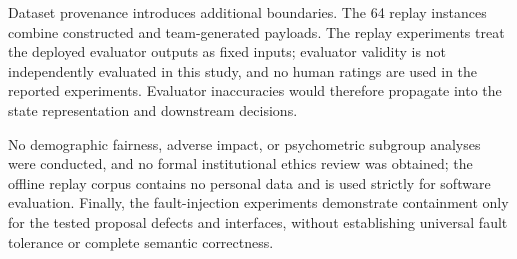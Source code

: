 Dataset provenance introduces additional boundaries. The 64 replay instances combine constructed and team-generated payloads. The replay experiments treat the deployed evaluator outputs as fixed inputs; evaluator validity is not independently evaluated in this study, and no human ratings are used in the reported experiments. Evaluator inaccuracies would therefore propagate into the state representation and downstream decisions.

No demographic fairness, adverse impact, or psychometric subgroup analyses were conducted, and no formal institutional ethics review was obtained; the offline replay corpus contains no personal data and is used strictly for software evaluation. Finally, the fault-injection experiments demonstrate containment only for the tested proposal defects and interfaces, without establishing universal fault tolerance or complete semantic correctness.
